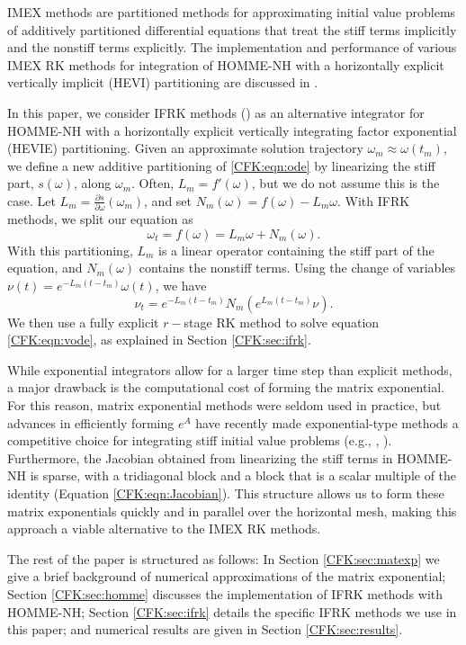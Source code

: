\documentclass{csri19}
\begin{document}
IMEX methods are partitioned methods for approximating initial value 
problems of additively partitioned differential equations that treat the 
stiff terms implicitly and the nonstiff terms explicitly. The 
implementation and performance of various IMEX RK methods for integration 
of HOMME-NH with a horizontally explicit vertically implicit (HEVI) 
partitioning are discussed in \cite{CFK:Steyer2019}.

In this paper, we consider IFRK methods (\cite{CFK:Minchev2006}) as 
an alternative integrator for HOMME-NH with a horizontally explicit 
vertically integrating factor exponential (HEVIE) partitioning. Given an 
approximate solution trajectory $\omega_m \approx \omega(t_m)$, we define 
a new additive partitioning of \ref{CFK:eqn:ode} by linearizing the stiff 
part, $s(\omega)$, along $\omega_m$. Often, $L_m = f'(\omega)$, but we do 
not assume this is the case. Let $L_m=\frac{\partial s}{\partial{\omega}}
(\omega_m)$, and set $N_m(\omega) = f(\omega) - L_m \omega$. With IFRK 
methods, we split our equation as \[ \omega_t = f(\omega) = L_m\omega +  
N_m(\omega).\] With this partitioning, $L_m$ is a  linear operator 
containing the stiff part of the equation, and $N_m(\omega)$ contains the 
nonstiff terms. Using the change of variables $\nu(t)=e^{-L_m(t-t_m)}
\omega(t)$, we have 
\begin{equation}\label{CFK:eqn:vode}
\nu_t = e^{-L_m(t-t_m)}N_m(e^{L_m(t-t_m)}\nu). \end{equation} 
We then use a fully explicit $r-$stage RK method to solve equation 
\ref{CFK:eqn:vode}, as explained in Section \ref{CFK:sec:ifrk}.

While exponential integrators allow for a larger time step than explicit 
methods, a major drawback is the computational cost of forming the matrix 
exponential. For this reason, matrix exponential methods were seldom used 
in practice, but advances in efficiently forming $e^A$ have recently made 
exponential-type methods a competitive choice for integrating stiff initial 
value problems (e.g., \cite{CFK:Clancy2013}, \cite{CFK:Garcia2014}). 
Furthermore, the Jacobian obtained from linearizing the stiff terms in 
HOMME-NH is sparse, with a tridiagonal block and a block that is a scalar 
multiple of the identity (Equation \ref{CFK:eqn:Jacobian}). This structure 
allows us to form these matrix exponentials quickly and in parallel over 
the horizontal mesh, making this approach a viable alternative to the IMEX 
RK methods.

The rest of the paper is structured as follows: In Section 
\ref{CFK:sec:matexp} we give a brief background of numerical approximations 
of the matrix exponential; Section \ref{CFK:sec:homme} discusses the 
implementation of IFRK methods with HOMME-NH; Section \ref{CFK:sec:ifrk} 
details the specific IFRK methods we use in this paper; and numerical 
results are given in Section \ref{CFK:sec:results}.
\end{document}
